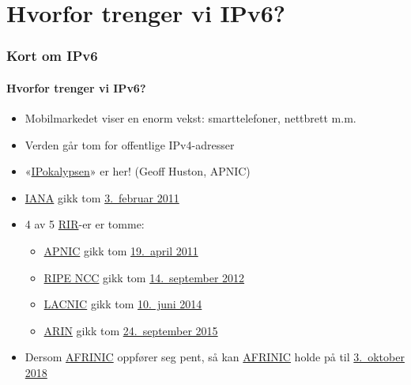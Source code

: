 \section{Hvorfor trenger vi IPv6?}
\begin{frame}%
  \frametitle{Kort om IPv6}
  \framesubtitle{Hvorfor trenger vi IPv6?}
  \begin{itemize}%
  \item Mobilmarkedet viser en enorm vekst: smarttelefoner, nettbrett m.m.
  \item Verden går tom for offentlige IPv4-adresser
  \item
    «\href{http://www.potaroo.net/presentations/2012-05-22-terena.pdf}{IPokalypsen}»
    er her! (Geoff Huston, APNIC)
  \item \href{http://www.iana.org/}{IANA} gikk tom
    \href{http://www.icann.org/en/news/press/releases/release-03feb11-en.pdf}{3.~februar
      2011}
  \item 4 av 5
    \href{http://en.wikipedia.org/wiki/Regional_Internet_registry}{RIR}-er
    er tomme:
    \begin{itemize}%
    \item \href{http://www.apnic.net/}{APNIC} gikk tom
      \href{http://www.apnic.net/community/ipv4-exhaustion/graphical-information}{19.~april
        2011}
    \item \href{http://www.ripe.net/}{RIPE NCC} gikk tom
      \href{http://www.ripe.net/internet-coordination/ipv4-exhaustion}{14.~september
        2012}
    \item \href{http://www.lacnic.net/en/web/lacnic/inicio}{LACNIC}
      gikk tom
      \href{http://www.lacnic.net/en/web/lacnic/agotamiento-ipv4}{10.~juni
        2014}
    \item \href{https://www.arin.net/}{ARIN} gikk tom
      \href{https://www.arin.net/announcements/2015/20150924.html}{24.~september
        2015}
    \end{itemize}
  \item Dersom \href{http://www.afrinic.net/}{AFRINIC} oppfører seg
    pent, så kan
    \href{http://afrinic.net/en/community/ipv4-exhaustion}{AFRINIC}
    holde på til \href{http://www.potaroo.net/tools/ipv4/}{3.\ oktober
      2018}
  \end{itemize}
\end{frame}

